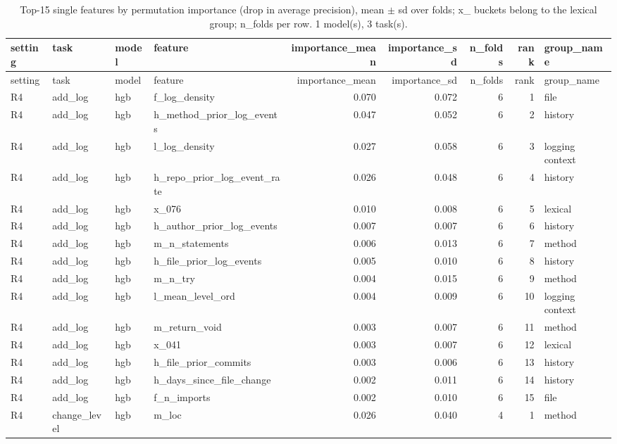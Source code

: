 {\scriptsize
\begin{longtable}{llllrrrrl}
\caption{Top-15 single features by permutation importance (drop in average precision), mean $\pm$ sd over folds; x\_ buckets belong to the lexical group; n\_folds per row. 1 model(s), 3 task(s).}\label{tab:rq2_importance_features}\\
\toprule
setting & task & model & feature & importance\_mean & importance\_sd & n\_folds & rank & group\_name \\
\midrule
\endfirsthead
\toprule
setting & task & model & feature & importance\_mean & importance\_sd & n\_folds & rank & group\_name \\
\midrule
\endhead
\bottomrule
\endfoot
R4 & add\_log & hgb & f\_log\_density & 0.070 & 0.072 & 6 & 1 & file \\
R4 & add\_log & hgb & h\_method\_prior\_log\_events & 0.047 & 0.052 & 6 & 2 & history \\
R4 & add\_log & hgb & l\_log\_density & 0.027 & 0.058 & 6 & 3 & logging context \\
R4 & add\_log & hgb & h\_repo\_prior\_log\_event\_rate & 0.026 & 0.048 & 6 & 4 & history \\
R4 & add\_log & hgb & x\_076 & 0.010 & 0.008 & 6 & 5 & lexical \\
R4 & add\_log & hgb & h\_author\_prior\_log\_events & 0.007 & 0.007 & 6 & 6 & history \\
R4 & add\_log & hgb & m\_n\_statements & 0.006 & 0.013 & 6 & 7 & method \\
R4 & add\_log & hgb & h\_file\_prior\_log\_events & 0.005 & 0.010 & 6 & 8 & history \\
R4 & add\_log & hgb & m\_n\_try & 0.004 & 0.015 & 6 & 9 & method \\
R4 & add\_log & hgb & l\_mean\_level\_ord & 0.004 & 0.009 & 6 & 10 & logging context \\
R4 & add\_log & hgb & m\_return\_void & 0.003 & 0.007 & 6 & 11 & method \\
R4 & add\_log & hgb & x\_041 & 0.003 & 0.007 & 6 & 12 & lexical \\
R4 & add\_log & hgb & h\_file\_prior\_commits & 0.003 & 0.006 & 6 & 13 & history \\
R4 & add\_log & hgb & h\_days\_since\_file\_change & 0.002 & 0.011 & 6 & 14 & history \\
R4 & add\_log & hgb & f\_n\_imports & 0.002 & 0.010 & 6 & 15 & file \\
R4 & change\_level & hgb & m\_loc & 0.026 & 0.040 & 4 & 1 & method \\

\end{longtable}}
